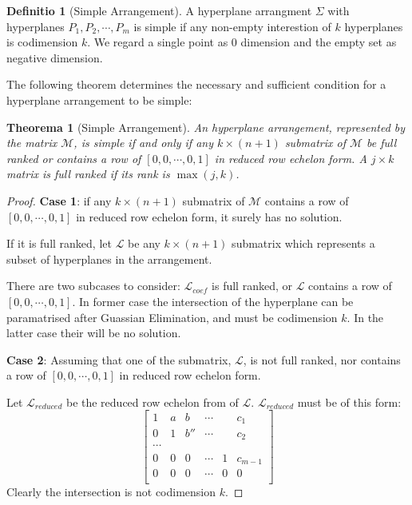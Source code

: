 \documentclass[12pt, a4paper]{article}
\newtheorem{theorem}{Theorema}[subsection]
\theoremstyle{definition}
\newtheorem{definition}{Definitio}[section]
\theoremstyle{remark}
\begin{document}
\begin{definition}[Simple Arrangement]
A hyperplane arrangment $\Sigma$ with hyperplanes $P_1, P_2, \cdots, P_m$ is simple if any non-empty interestion of $k$ hyperplanes is codimension $k$.
We regard a single point as 0 dimension and the empty set as negative dimension.
\end{definition}

The following theorem determines the necessary and sufficient condition for a hyperplane arrangement to be simple:

\begin{theorem}[Simple Arrangement]
	An hyperplane arrangement, represented by the matrix $\mathcal{M}$, is simple if and only if any $k \times (n+1) $ submatrix of $\mathcal{M}$ be full ranked or contains a row of $[0, 0, \cdots, 0, 1]$ in reduced row echelon form. 
	A $j \times  k$ matrix is full ranked if its rank is $\max(j,k)$.
\end{theorem}

\begin{proof}
	\textbf{Case 1}: if any $k\times (n+1)$ submatrix of $\mathcal{M}$ contains a row of $[0, 0, \cdots, 0, 1]$ in reduced row echelon form, it surely has no solution. 

	If it is full ranked, 
	let $\mathcal{L}$ be any $k \times (n+1)$ submatrix which represents a subset of hyperplanes in the arrangement.

	There are two subcases to consider: $\mathcal{L}_{coef}$  is full ranked, or $\mathcal{L}$ contains a row of $[0,0,\cdots , 0 ,1]$. 
	In former case the intersection of the hyperplane can be paramatrised after Guassian Elimination, and must be codimension $k$. In the latter case their will be no solution.

	\textbf{Case 2}: Assuming that one of the submatrix, $\mathcal{L}$, is not full ranked, nor contains a row of $[0, 0, \cdots, 0, 1]$ in reduced row echelon form.

	Let $\mathcal{L}_{reduced}$ be the reduced row echelon from of $\mathcal{L}$.
		 $\mathcal{L}_{reduced}$ must be of this form:
			$$
			\begin{bmatrix}
				1 & a & b & \cdots &  &  c_1\\
				0 & 1 & b'' & \cdots &  &  c_2\\
				\cdots \\
				0 & 0 & 0 & \cdots & 1 &  c_{m-1}\\
				0 & 0 & 0 & \cdots & 0 & 0 \\
			\end{bmatrix}
			$$
	Clearly the intersection is not codimension $k$.
\end{proof}
\end{document}
